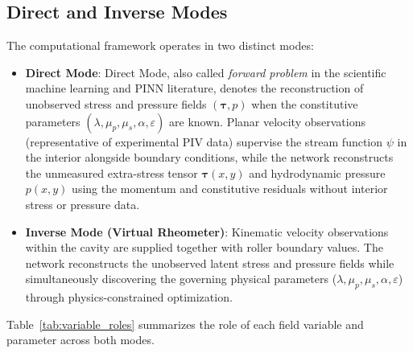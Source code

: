 \subsection{Direct and Inverse Modes}
\label{subsec:forward_inverse_operational_modes}

The computational framework operates in two distinct modes:
\begin{itemize}
    \item \textbf{Direct Mode}:
        Direct Mode, also called \textit{forward problem}
        in the scientific machine learning and PINN literature, denotes the reconstruction
        of unobserved stress and pressure fields $(\boldsymbol{\tau}, p)$ when the
        constitutive parameters $(\lambda, \mu_p, \mu_s, \alpha, \varepsilon)$ are known.
        Planar velocity observations (representative of experimental PIV data) supervise
        the stream function $\psi$ in the interior alongside boundary conditions,
        while the network reconstructs the unmeasured extra-stress tensor
        $\boldsymbol{\tau}(x, y)$ and hydrodynamic pressure $p(x, y)$ using the
        momentum and constitutive residuals without interior stress or pressure data.
    \item \textbf{Inverse Mode (Virtual Rheometer)}:
        Kinematic velocity observations within the cavity are supplied together
        with roller boundary values. The network reconstructs the unobserved
        latent stress and pressure fields while simultaneously discovering the
        governing physical parameters ($\lambda, \mu_p, \mu_s, \alpha,
        \varepsilon$) through physics-constrained optimization.
\end{itemize}

Table~\ref{tab:variable_roles} summarizes the role of each field variable and
parameter across both modes.

